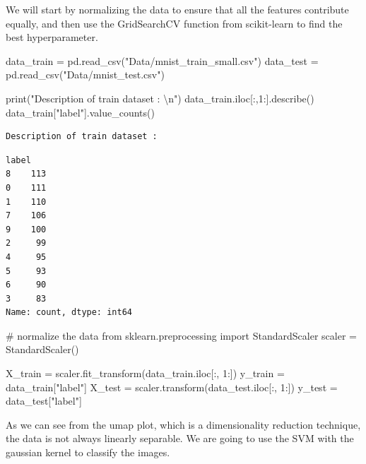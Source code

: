 \documentclass[
  letterpaper,
  DIV=11,
  numbers=noendperiod]{scrartcl}
\newenvironment{Shaded}{\begin{snugshade}}{\end{snugshade}}
\newcommand{\BuiltInTok}[1]{\textcolor[rgb]{0.00,0.23,0.31}{#1}}
\newcommand{\CharTok}[1]{\textcolor[rgb]{0.13,0.47,0.30}{#1}}
\newcommand{\CommentTok}[1]{\textcolor[rgb]{0.37,0.37,0.37}{#1}}
\newcommand{\DecValTok}[1]{\textcolor[rgb]{0.68,0.00,0.00}{#1}}
\newcommand{\ImportTok}[1]{\textcolor[rgb]{0.00,0.46,0.62}{#1}}
\newcommand{\NormalTok}[1]{\textcolor[rgb]{0.00,0.23,0.31}{#1}}
\newcommand{\OperatorTok}[1]{\textcolor[rgb]{0.37,0.37,0.37}{#1}}
\newcommand{\StringTok}[1]{\textcolor[rgb]{0.13,0.47,0.30}{#1}}
\begin{document}
We will start by normalizing the data to ensure that all the features
contribute equally, and then use the GridSearchCV function from
scikit-learn to find the best hyperparameter.

\begin{Shaded}
\begin{Highlighting}[]
\NormalTok{data\_train }\OperatorTok{=}\NormalTok{ pd.read\_csv(}\StringTok{"Data/mnist\_train\_small.csv"}\NormalTok{)}
\NormalTok{data\_test }\OperatorTok{=}\NormalTok{ pd.read\_csv(}\StringTok{"Data/mnist\_test.csv"}\NormalTok{)}

\BuiltInTok{print}\NormalTok{(}\StringTok{"Description of train dataset : }\CharTok{\textbackslash{}n}\StringTok{"}\NormalTok{)}
\NormalTok{data\_train.iloc[:,}\DecValTok{1}\NormalTok{:].describe()}
\NormalTok{data\_train[}\StringTok{"label"}\NormalTok{].value\_counts()}
\end{Highlighting}
\end{Shaded}

\begin{verbatim}
Description of train dataset : 
\end{verbatim}

\begin{verbatim}
label
8    113
0    111
1    110
7    106
9    100
2     99
4     95
5     93
6     90
3     83
Name: count, dtype: int64
\end{verbatim}

\begin{Shaded}
\begin{Highlighting}[]
\CommentTok{\# normalize the data}
\ImportTok{from}\NormalTok{ sklearn.preprocessing }\ImportTok{import}\NormalTok{ StandardScaler}
\NormalTok{scaler }\OperatorTok{=}\NormalTok{ StandardScaler()}

\NormalTok{X\_train  }\OperatorTok{=}\NormalTok{ scaler.fit\_transform(data\_train.iloc[:, }\DecValTok{1}\NormalTok{:])}
\NormalTok{y\_train }\OperatorTok{=}\NormalTok{ data\_train[}\StringTok{"label"}\NormalTok{]}
\NormalTok{X\_test  }\OperatorTok{=}\NormalTok{ scaler.transform(data\_test.iloc[:, }\DecValTok{1}\NormalTok{:])}
\NormalTok{y\_test }\OperatorTok{=}\NormalTok{ data\_test[}\StringTok{"label"}\NormalTok{]}
\end{Highlighting}
\end{Shaded}

As we can see from the umap plot, which is a dimensionality reduction
technique, the data is not always linearly separable. We are going to
use the SVM with the gaussian kernel to classify the images.
\end{document}
